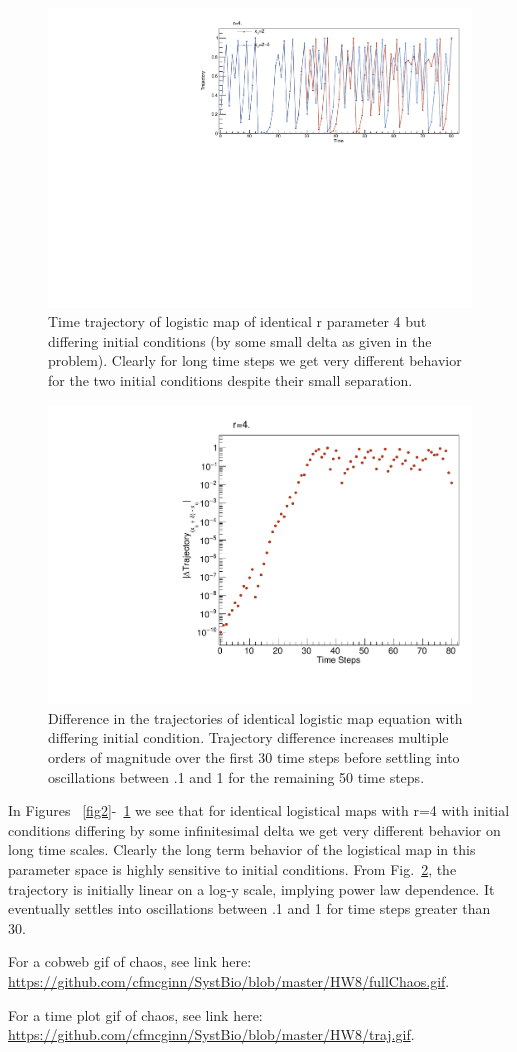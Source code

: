 \documentclass{article}
\begin{document}
\begin{figure}[H]
    \centering
    \includegraphics[width=.8\textwidth]{traj_79.pdf} 
    \caption{Time trajectory of logistic map of identical r parameter 4 but differing initial conditions (by some small delta as given in the problem). Clearly for long time steps we get very different behavior for the two initial conditions despite their small separation.}
    \label{fig3}
\end{figure}

\begin{figure}[H]
    \centering
    \includegraphics[width=.45\textwidth]{deltaTraj.pdf} 
    \caption{Difference in the trajectories of identical logistic map equation with differing initial condition. Trajectory difference increases multiple orders of magnitude over the first 30 time steps before settling into oscillations between .1 and 1 for the remaining 50 time steps.}
    \label{fig4}
\end{figure}

In Figures ~\ref{fig2}-~\ref{fig3} we see that for identical logistical maps with r=4 with initial conditions differing by some infinitesimal delta we get very different behavior on long time scales. Clearly the long term behavior of the logistical map in this parameter space is highly sensitive to initial conditions. From Fig.~\ref{fig4}, the trajectory is initially linear on a log-y scale, implying power law dependence. It eventually settles into oscillations between .1 and 1 for time steps greater than 30.


For a cobweb gif of chaos, see link here: \href{https://github.com/cfmcginn/SystBio/blob/master/HW8/fullChaos.gif}{https://github.com/cfmcginn/SystBio/blob/master/HW8/fullChaos.gif}.

For a time plot gif of chaos, see link here: \href{https://github.com/cfmcginn/SystBio/blob/master/HW8/traj.gif}{https://github.com/cfmcginn/SystBio/blob/master/HW8/traj.gif}.
\end{document}
